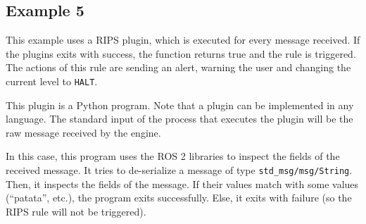 \documentclass[a4paper]{article}
\begin{document}



\subsection{Example 5}

This example uses a RIPS plugin, which is executed for every message
received. If the plugins exits with success, the function returns
true and the rule is triggered. The actions of this rule are sending
an alert, warning the user and changing the current level to \texttt{HALT}.



This plugin is a Python program. Note that a plugin can be implemented
in any language. The standard input of the process that executes the plugin
will be the raw message received by the engine.

In this case, this program
uses the ROS 2 libraries to inspect the fields of the received message.
It tries to de-serialize a message of type \texttt{std\_msg/msg/String}.
Then, it inspects the fields of the message. If their values match with
some values (``patata'', etc.), the program exits successfully. Else,
it exits with failure (so the RIPS rule will not be triggered).


\end{document}
